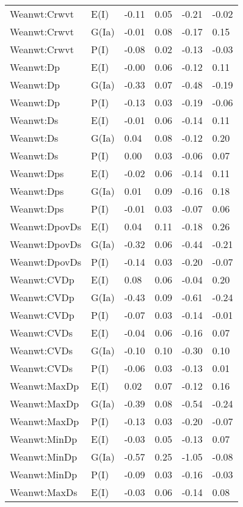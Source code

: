 \begin{center}
\begin{longtable}{|p{1.1in}|p{0.7in}|p{0.7in}|p{0.6in}|p{0.6in}|p{0.6in}|}
  Weanwt:Crwvt & E(I) & -0.11 & 0.05 & -0.21 & -0.02 \\ 
  Weanwt:Crwvt & G(Ia) & -0.01 & 0.08 & -0.17 & 0.15 \\ 
  Weanwt:Crwvt & P(I) & -0.08 & 0.02 & -0.13 & -0.03 \\ 
  Weanwt:Dp & E(I) & -0.00 & 0.06 & -0.12 & 0.11 \\ 
  Weanwt:Dp & G(Ia) & -0.33 & 0.07 & -0.48 & -0.19 \\ 
  Weanwt:Dp & P(I) & -0.13 & 0.03 & -0.19 & -0.06 \\ 
  Weanwt:Ds & E(I) & -0.01 & 0.06 & -0.14 & 0.11 \\ 
  Weanwt:Ds & G(Ia) & 0.04 & 0.08 & -0.12 & 0.20 \\ 
  Weanwt:Ds & P(I) & 0.00 & 0.03 & -0.06 & 0.07 \\ 
  Weanwt:Dps & E(I) & -0.02 & 0.06 & -0.14 & 0.11 \\ 
  Weanwt:Dps & G(Ia) & 0.01 & 0.09 & -0.16 & 0.18 \\ 
  Weanwt:Dps & P(I) & -0.01 & 0.03 & -0.07 & 0.06 \\ 
  Weanwt:DpovDs & E(I) & 0.04 & 0.11 & -0.18 & 0.26 \\ 
  Weanwt:DpovDs & G(Ia) & -0.32 & 0.06 & -0.44 & -0.21 \\ 
  Weanwt:DpovDs & P(I) & -0.14 & 0.03 & -0.20 & -0.07 \\ 
  Weanwt:CVDp & E(I) & 0.08 & 0.06 & -0.04 & 0.20 \\ 
  Weanwt:CVDp & G(Ia) & -0.43 & 0.09 & -0.61 & -0.24 \\ 
  Weanwt:CVDp & P(I) & -0.07 & 0.03 & -0.14 & -0.01 \\ 
  Weanwt:CVDs & E(I) & -0.04 & 0.06 & -0.16 & 0.07 \\ 
  Weanwt:CVDs & G(Ia) & -0.10 & 0.10 & -0.30 & 0.10 \\ 
  Weanwt:CVDs & P(I) & -0.06 & 0.03 & -0.13 & 0.01 \\ 
  Weanwt:MaxDp & E(I) & 0.02 & 0.07 & -0.12 & 0.16 \\ 
  Weanwt:MaxDp & G(Ia) & -0.39 & 0.08 & -0.54 & -0.24 \\ 
  Weanwt:MaxDp & P(I) & -0.13 & 0.03 & -0.20 & -0.07 \\ 
  Weanwt:MinDp & E(I) & -0.03 & 0.05 & -0.13 & 0.07 \\ 
  Weanwt:MinDp & G(Ia) & -0.57 & 0.25 & -1.05 & -0.08 \\ 
  Weanwt:MinDp & P(I) & -0.09 & 0.03 & -0.16 & -0.03 \\ 
  Weanwt:MaxDs & E(I) & -0.03 & 0.06 & -0.14 & 0.08 \\ 

\end{longtable}
\end{center}
